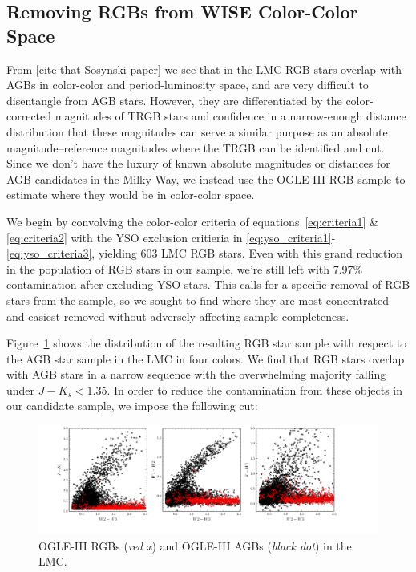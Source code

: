 \subsection{Removing RGBs from WISE Color-Color Space}\label{sec:kill_rgbs}
From [cite that Sosynski paper] we see that in the LMC RGB stars overlap with AGBs in color-color and period-luminosity space, and are very difficult to disentangle from AGB stars. However, they are differentiated by the color-corrected magnitudes of TRGB stars and confidence in a narrow-enough distance distribution that these magnitudes can serve a similar purpose as an absolute magnitude--reference magnitudes where the TRGB can be identified and cut. Since we don't have the luxury of known absolute magnitudes or distances for AGB candidates in the Milky Way, we instead use the OGLE-III RGB sample to estimate where they would be in color-color space.

We begin by convolving the color-color criteria of equations~\ref{eq:criteria1} \& \ref{eq:criteria2} with the YSO exclusion critieria in \ref{eq:yso_criteria1}-\ref{eq:yso_criteria3}, yielding 603 LMC RGB stars. 
Even with this grand reduction in the population of RGB stars in our sample, we're still left with 7.97\% contamination after excluding YSO stars. This calls for a specific removal of RGB stars from the sample, so we sought to find where they are most concentrated and easiest removed without adversely affecting sample completeness.

Figure~\ref{fig:rgbs_lmc} shows the distribution of the resulting RGB star sample with respect to the AGB star sample in the LMC in four colors. 
We find that RGB stars overlap with AGB stars in a narrow sequence with the overwhelming majority falling under $J-K_s < 1.35$. In order to reduce the contamination from these objects in our candidate sample, we impose the following cut:

\begin{figure}[h]
\includegraphics[width=6.5in]{figs/agbs_rgbs_color.pdf}
\caption{OGLE-III RGBs (\emph{red x}) and OGLE-III AGBs (\emph{black dot}) in the LMC. 
\label{fig:rgbs_lmc}}
\end{figure}

